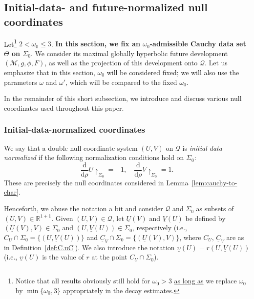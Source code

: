 \documentclass[10pt, reqno]{amsart}
\theoremstyle{definition}
\theoremstyle{remark}
\theoremstyle{conjecture}
\numberwithin{equation}{section}
\newcommand{\set}[1]{\{#1\}}
\newcommand{\ud}{\mathrm{d}}
\newcommand{\0}{\emptyset}
\newcommand{\Sgm}{\Sigma}
\newcommand{\Tht}{\Theta}
\newcommand{\omg}{\omega}
\newcommand{\ups}{\upsilon}
\newcommand{\bbR}{\mathbb R}
\newcommand{\calM}{\mathcal M}
\newcommand{\calQ}{\mathcal Q}
\newcommand{\PD}{\calQ}
\newcommand{\uC}{\underline{C}}
\begin{document}
  

\subsection{Initial-data- and future-normalized null coordinates} \label{subsec:bg-coords}
Let\footnote{{Notice that all results obviously still hold for $\omg_{0}>3$ \underline{as long as} we replace $\omg_0$ by $\min\{\omg_0,3\}$ appropriately in the decay estimates.}} $2 < \omg_{0} \leq 3$. \textbf{In this section, we fix an $\omg_{0}$-admissible Cauchy data set $\Tht$ on $\Sgm_{0}$}. We consider its maximal globally hyperbolic future development $(\calM, g, \phi, F)$, as well as the projection of this development onto $\mathcal Q$. Let us emphasize that in this section, $\omg_0$ will be considered fixed; we will also use the parameters $\omg$ and $\omg'$, which will be compared to the fixed $\omg_0$.

In the remainder of this short subsection, we introduce and discuss various null coordinates used throughout this paper. 

\subsubsection*{Initial-data-normalized coordinates}
We say that a double null coordinate system $(U, V)$ on $\PD$ is \emph{initial-data-normalized} if the following normalization conditions hold on $\Sgm_{0}$:
\begin{equation} \label{eq:coord-UV}
	\frac{\ud}{\ud \rho} U \restriction_{\Sgm_{0}} = - 1, \quad 
	\frac{\ud}{\ud \rho} V \restriction_{\Sgm_{0}} = 1.
\end{equation}
These are precisely the null coordinates considered in Lemma~\ref{lem:cauchy-to-char}. 

Henceforth, we abuse the notation a bit and consider $\PD$ and $\Sgm_{0}$ as subsets of $(U, V) \in \bbR^{1+1}$. Given $(U, V) \in \PD$, let $\underline{U}(V)$ and $\underline{V}(U)$ be defined by $(\underline{U}(V), V) \in \Sgm_{0}$ and $(U, \underline{V}(U)) \in \Sgm_{0}$, respectively (i.e., $C_{U} \cap \Sgm_{0} = \set{(U, \underline{V}(U))}$ and $\uC_{V} \cap \Sgm_{0} = \set{(\underline{U}(V), V)}$, where $C_U$, $\uC_{V}$ are as in Definition~\ref{def:C.uC}). We also introduce the notation $\underline{\ups} (U) = r(U, \underline{V}(U))$ (i.e., $\underline{\ups}(U)$ is the value of $r$ at the point $C_{U} \cap \Sgm_{0}$). 
\end{document}
